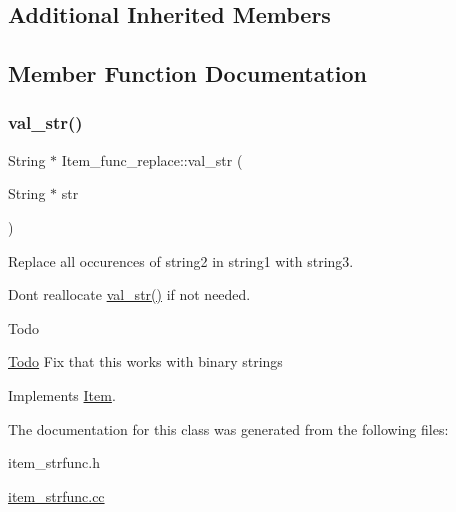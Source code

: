 \subsection*{Additional Inherited Members}


\subsection{Member Function Documentation}
\mbox{\label{classItem__func__replace_a339fa98601454ef99451c1c2daf5d1a4}} 
\subsubsection{\texorpdfstring{val\+\_\+str()}{val\_str()}}
{\footnotesize\ttfamily String $\ast$ Item\+\_\+func\+\_\+replace\+::val\+\_\+str (\begin{DoxyParamCaption}\item[{String $\ast$}]{str }\end{DoxyParamCaption})\hspace{0.3cm}{\ttfamily [virtual]}}

Replace all occurences of string2 in string1 with string3.

Don\textquotesingle{}t reallocate \mbox{\hyperlink{classItem__func__replace_a339fa98601454ef99451c1c2daf5d1a4}{val\+\_\+str()}} if not needed.

\begin{DoxyRefDesc}{Todo}
\item[\mbox{\hyperlink{todo__todo000034}{Todo}}]Fix that this works with binary strings \end{DoxyRefDesc}


Implements \mbox{\hyperlink{classItem}{Item}}.



The documentation for this class was generated from the following files\+:\begin{DoxyCompactItemize}
\item 
item\+\_\+strfunc.\+h\item 
\mbox{\hyperlink{item__strfunc_8cc}{item\+\_\+strfunc.\+cc}}\end{DoxyCompactItemize}
